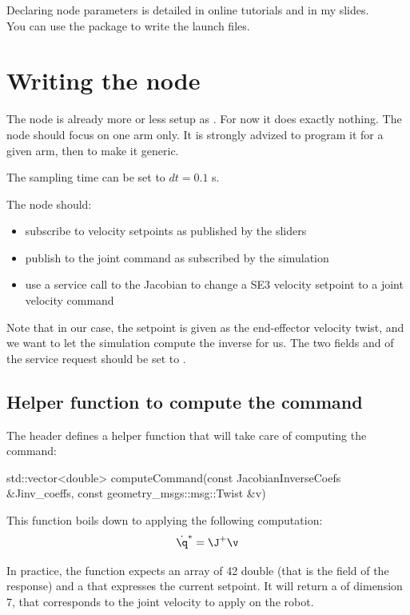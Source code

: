 \documentclass{ecnreport}
\begin{document}
Declaring node parameters is detailed in online tutorials and in my slides.\\

You can use the  package to write the launch files.\\

 \newpage

\section{Writing the node}

The node is already more or less setup as . For now it does exactly nothing. The node should focus on one arm only.
It is strongly advized to program it for a given arm, then to make it generic.

The sampling time can be set to $dt = 0.1$ s.

The node should:
\begin{itemize}
 \item subscribe to velocity setpoints as published by the sliders
 \item publish to the joint command as subscribed by the simulation
 \item use a service call to the Jacobian to change a SE3 velocity setpoint to a joint velocity command
\end{itemize}
Note that in our case, the setpoint is given as the end-effector velocity twist, and we want to let the simulation compute the inverse for us. The two fields  and  of the service request should be set to .

\subsection{Helper function to compute the command}

The  header defines a helper function that will take care of computing the command:
\begin{cppcode}
std::vector<double> computeCommand(const JacobianInverseCoefs &Jinv_coeffs,
                                       const geometry_msgs::msg::Twist &v)
\end{cppcode}
This function boils down to applying the following computation:
\begin{equation*}
 \dot\q^* = \J^+\v
\end{equation*}

In practice, the function expects an array of 42 double (that is the  field of the response) and a  that expresses the current setpoint.
It will return a  of dimension 7, that corresponds to the joint velocity to apply on the robot.
\end{document}
